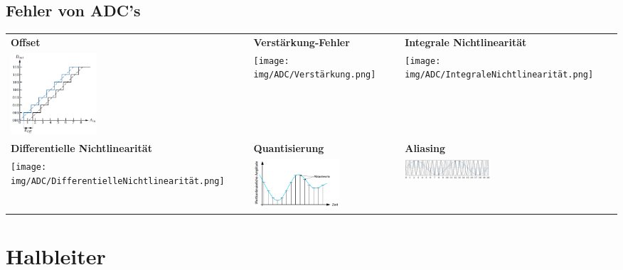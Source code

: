 \documentclass[margin=normal]{tex/hsrzf}
\begin{document}
\subsection{Fehler von ADC's}
\begin{tabularx}{\textwidth}{p{}p{}p{}}
  \textbf{Offset}
   &
  \textbf{Verstärkung-\newline Fehler}
   &
  \textbf{Integrale \newline Nichtlinearität}
  \\
  \includegraphics[width = 3.2cm]{img/ADC/OffsetFehler.png}
   &
  \texttt{[image: img/ADC/Verstärkung.png]}
   &
  \texttt{[image: img/ADC/IntegraleNichtlinearität.png]}
  \\
  \textbf{Differentielle Nichtlinearität}
   &
  \textbf{Quantisierung}
   &
  \textbf{Aliasing}
  \\
  \texttt{[image: img/ADC/DifferentielleNichtlinearität.png]}
   &
  \includegraphics[width = 3.2cm]{img/ADC/Quantisierungsfehler.png}
   &
  \includegraphics[width = 3.2cm]{img/ADC/Aliasing.png}
\end{tabularx}
\normalsize

\section{Halbleiter}
\end{document}
